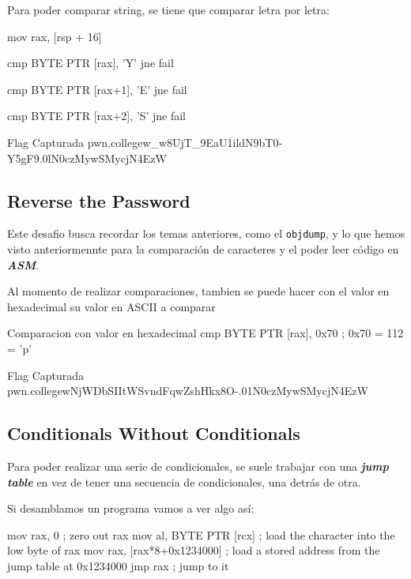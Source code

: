 Para poder comparar string, se tiene que comparar letra por letra:
\begin{codebox}[ASM]{}
	mov rax, [rsp + 16]

	cmp BYTE PTR [rax], 'Y'
	jne fail

	cmp BYTE PTR [rax+1], 'E'
	jne fail

	cmp BYTE PTR [rax+2], 'S'
	jne fail
\end{codebox}
\begin{flagbox}{Flag Capturada}
	pwn.college{w_w8UjT_9EaU1ildN9bT0-Y5gF9.0lN0czMywSMycjN4EzW}
\end{flagbox}

\subsection{Reverse the Password} \label{subsec:reverse_the_password}

Este desafio busca recordar los temas anteriores, como el \texttt{objdump}, y lo que hemos visto
anteriormennte para la comparación de caracteres y el poder leer código en \textbf{\textit{ASM}}.

\begin{infobox}[Consideraciones]
	Al momento de realizar comparaciones, tambien se puede hacer con el valor en hexadecimal su valor en ASCII a comparar

	\begin{codebox}[ASM]{Comparacion con valor en hexadecimal}
		cmp BYTE PTR [rax], 0x70 ; 0x70 = 112 = 'p'
	\end{codebox}
\end{infobox}

\begin{flagbox}{Flag Capturada}
	pwn.college{wNjWDbSIItWSvndFqwZshHkx8O-.01N0czMywSMycjN4EzW}
\end{flagbox}

\subsection{Conditionals Without Conditionals} \label{subsec:conditionals_without_conditionals}

Para poder realizar una serie de condicionales, se suele trabajar con una \textbf{\textit{jump table}}
en vez de tener una secuencia de condicionales, una detrás de otra.

Si desamblamos un programa vamos a ver algo así:

\begin{codebox}[ASM]{}
	mov    rax, 0                    ; zero out rax
	mov    al, BYTE PTR [rcx]        ; load the character into the low byte of rax
	mov    rax, [rax*8+0x1234000]    ; load a stored address from the jump table at 0x1234000
	jmp    rax                       ; jump to it
\end{codebox}

